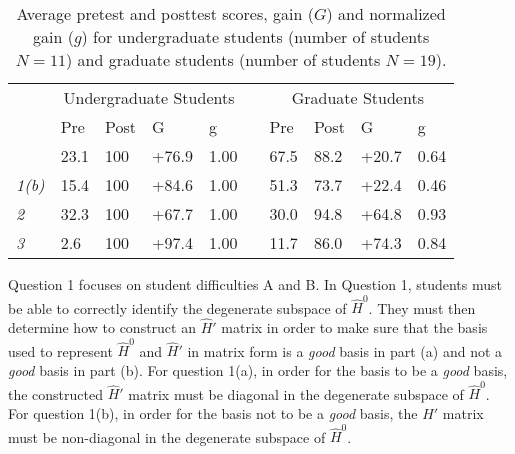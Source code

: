 \documentclass[aps,pra,showpacs,showkeys,twocolumn,groupedaddress]{revtex4-1}
\begin{document}
\begin{table}[!tbp]
  \caption[Comparison Group vs Incentivized Group Gains]{Average pretest and posttest scores, gain ($G$) and normalized gain ($g$) for undergraduate students (number of students $N=11$) and graduate students (number of students $N=19$). }
  \label{prepostpercent}
  \centering
  \begin{tabularx}{\linewidth}{>{\itshape}l XXXX c XXXX}
 
 \toprule
  \hline
  & \multicolumn{4}{c}{Undergraduate Students} & &\multicolumn{4}{c}{Graduate Students} \\
  \hhline{~----~----}
 
 
  & Pre & Post &\centering G&\centering g& & Pre & Post & \centering G& \hspace*{.07in} g \\
  \hhline{-----~----} 
   \multicolumn{1}{l}{1(a)}   &{ 23.1} &{ 100} &{ +76.9}& { 1.00}  & &{ 67.5} &{ 88.2} &{ +20.7} & { 0.64}\\
   {1(b)} &15.4 &100 &+84.6& 1.00&   &51.3 &73.7 &+22.4&0.46 \\
  2  &32.3 &100 &+67.7&1.00&    &30.0 &94.8 &+64.8&0.93 \\
  3  &2.6 &100 &+97.4& 1.00&   &11.7 &86.0 &+74.3&0.84 \\
  \hline
  
  \bottomrule
  \end{tabularx}
\end{table}

Question 1 
focuses on student difficulties A and B.  In Question 1, students must be able to correctly identify the degenerate subspace of $\hat{H}^0$.  They must then determine how to construct an $\hat{H}'$ matrix in order to make sure that the basis used to represent $\hat{H}^0$ and $\hat{H}'$ in matrix form is a {\it good} basis in part (a) and not a {\it good} basis in part (b).  For question 1(a), in order for the basis to be a {\it good} basis, the constructed $\hat{H}'$ matrix must be diagonal in the degenerate subspace of $\hat{H}^0$.  For question 1(b), in order for the basis not to be a {\it good} basis, the $\hat{H}'$ matrix must be non-diagonal in the degenerate subspace of $\hat{H}^0$.
\end{document}
